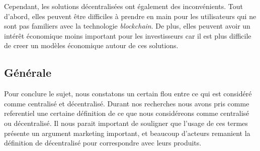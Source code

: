 Cependant, les solutions décentralisées ont également des inconvénients. Tout d’abord, elles peuvent être 
difficiles à prendre en main pour les utilisateurs qui ne sont pas familiers avec la technologie \textit{blockchain}. 
De plus, elles peuvent avoir un intérêt économique moins important pour les investisseurs car il est plus
difficile de creer un modèles économique autour de ces solutions.

\subsection{Générale}
Pour conclure le sujet, nous constatons un certain flou entre ce qui est considéré comme centralisé et décentralisé. 
Durant nos recherches nous avons pris comme referentiel une certaine définition de ce que nous considéreons comme
centralisé ou décentralisé. Il nous parait important de souligner que l'usage de ces termes présente un argument marketing
important, et beaucoup d'acteurs remanient la définition de décentralisé pour correspondre avec leurs produits.



